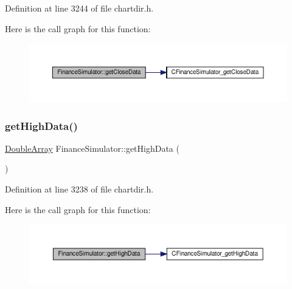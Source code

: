 Definition at line 3244 of file chartdir.\+h.

Here is the call graph for this function\+:
\nopagebreak
\begin{figure}[H]
\begin{center}
\leavevmode
\includegraphics[width=350pt]{class_finance_simulator_a3c85f600cc321db2f07de6e79455b1d5_cgraph}
\end{center}
\end{figure}
\mbox{\label{class_finance_simulator_a94b47db17544db3e9f49f34ed4063949}} 
\subsubsection{\texorpdfstring{get\+High\+Data()}{getHighData()}}
{\footnotesize\ttfamily \hyperlink{class_double_array}{Double\+Array} Finance\+Simulator\+::get\+High\+Data (\begin{DoxyParamCaption}{ }\end{DoxyParamCaption})\hspace{0.3cm}{\ttfamily [inline]}}



Definition at line 3238 of file chartdir.\+h.

Here is the call graph for this function\+:
\nopagebreak
\begin{figure}[H]
\begin{center}
\leavevmode
\includegraphics[width=350pt]{class_finance_simulator_a94b47db17544db3e9f49f34ed4063949_cgraph}
\end{center}
\end{figure}
\mbox{\label{class_finance_simulator_aba8c5020220b871f5a599d4424fc0697}} 
